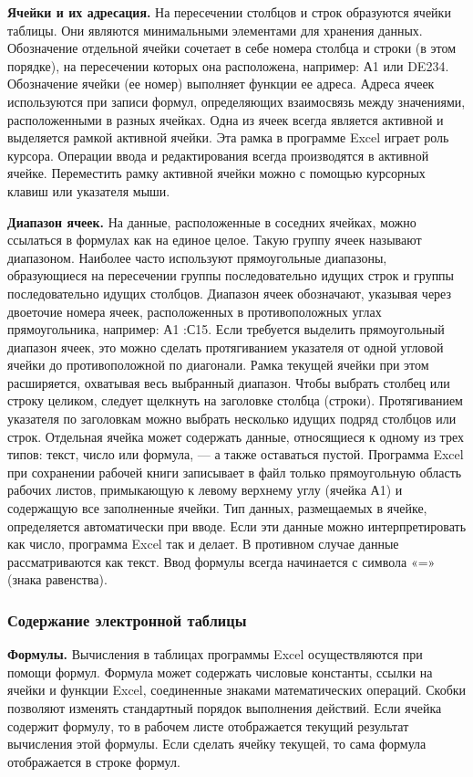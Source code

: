 \textbf{Ячейки и их адресация.} На пересечении столбцов и строк образуются ячейки таблицы. Они являются минимальными элементами для хранения данных. Обозначение отдельной ячейки сочетает в себе номера столбца и строки (в этом порядке), на пересечении которых она расположена, например: А1 или DE234. Обозначение ячейки (ее номер) выполняет функции ее адреса. Адреса ячеек используются при записи формул, определяющих взаимосвязь между значениями, расположенными в разных ячейках. Одна из ячеек всегда является активной и выделяется рамкой активной ячейки. Эта рамка в программе Excel играет роль курсора. Операции ввода и редактирования всегда производятся в активной ячейке. Переместить рамку активной ячейки можно с помощью курсорных клавиш или указателя мыши.

\textbf{Диапазон ячеек.} На данные, расположенные в соседних ячейках, можно ссылаться в формулах как на единое целое. Такую группу ячеек называют диапазоном. Наиболее часто используют прямоугольные диапазоны, образующиеся на пересечении группы последовательно идущих строк и группы последовательно идущих столбцов. Диапазон ячеек обозначают, указывая через двоеточие номера ячеек, расположенных в противоположных углах прямоугольника, например: А1 :С15. Если требуется выделить прямоугольный диапазон ячеек, это можно сделать протягиванием указателя от одной угловой ячейки до противоположной по диагонали. Рамка текущей ячейки при этом расширяется, охватывая весь выбранный диапазон. Чтобы выбрать столбец или строку целиком, следует щелкнуть на заголовке столбца (строки). Протягиванием указателя по заголовкам можно выбрать несколько идущих подряд столбцов или строк. Отдельная ячейка может содержать данные, относящиеся к одному из трех типов: текст, число или формула, --- а также оставаться пустой. Программа Excel при сохранении рабочей книги записывает в файл только прямоугольную область рабочих листов, примыкающую к левому верхнему углу (ячейка А1) и содержащую все заполненные ячейки. Тип данных, размещаемых в ячейке, определяется автоматически при вводе. Если эти данные можно интерпретировать как число, программа Excel так и делает. В противном случае данные рассматриваются как текст. Ввод формулы всегда начинается с символа «=» (знака равенства).

\subsubsection{Содержание электронной таблицы}

\textbf{Формулы.} Вычисления в таблицах программы Excel осуществляются при помощи формул. Формула может содержать числовые константы, ссылки на ячейки и функции Excel, соединенные знаками математических операций. Скобки позволяют изменять стандартный порядок выполнения действий. Если ячейка содержит формулу, то в рабочем листе отображается текущий результат вычисления этой формулы. Если сделать ячейку текущей, то сама формула отображается в строке формул.

